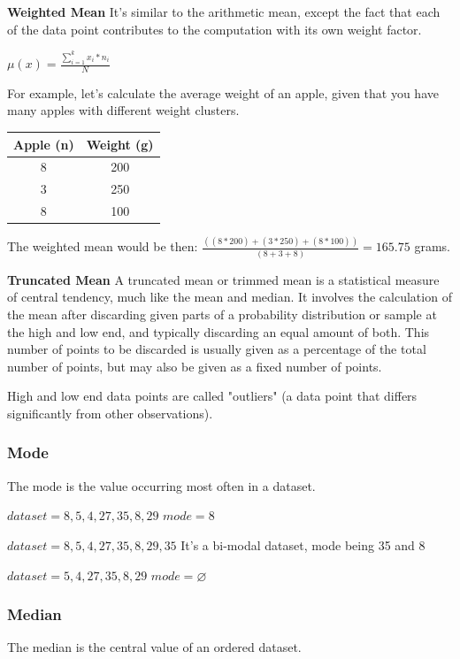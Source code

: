 \documentclass{article}
\begin{document}
\textbf{Weighted Mean}
It's similar to the arithmetic mean, except the fact that each of the data point contributes to the computation with its own weight factor.

$ \displaystyle \mu(x) = \frac{\sum \limits ^{k} _{i=1} x_i * n_i}{N}$

For example, let's calculate the average weight of an apple, given that you have many apples with different weight clusters.

\begin{center}
\begin{tabular}{|c|c|}
\hline
Apple (n) & Weight (g) \\ \hline
8 & 200 \\ 
3 & 250 \\ 
8 & 100 \\
\hline
\end{tabular}
\end{center}

The weighted mean would be then: $\frac{((8*200)+(3*250)+(8*100))}{(8+3+8)} = 165.75$ grams.  

\textbf{Truncated Mean}
A truncated mean or trimmed mean is a statistical measure of central tendency, much like the mean and median. It involves the calculation of the mean after discarding given parts of a probability distribution or sample at the high and low end, and typically discarding an equal amount of both. 
This number of points to be discarded is usually given as a percentage of the total number of points, but may also be given as a fixed number of points.

High and low end data points are called "outliers" (a data point that differs significantly from other observations).

\subsubsection{Mode}
The mode is the value occurring most often in a dataset.

$dataset = 8, 5, 4, 27, 35, 8, 29$
$mode = 8$

$dataset = 8, 5, 4, 27, 35, 8, 29, 35$
It’s a bi-modal dataset, mode being 35 and 8

$dataset =  5, 4, 27, 35, 8, 29$
$mode = \varnothing $

\subsubsection{Median}
The median is the central value of an ordered dataset.
\end{document}
